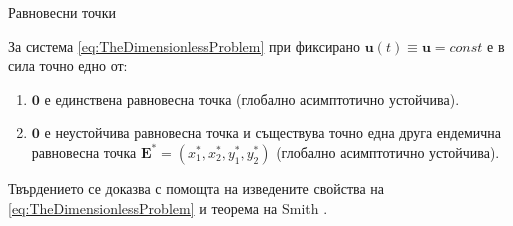\begin{frame}[t]{Равновесни точки}
  \begin{proposition}
    За система \eqref{eq:TheDimensionlessProblem} при фиксирано $\boldsymbol{u}(t) \equiv \boldsymbol{u} = const$ е в сила точно едно от:
    \begin{enumerate}
      \item $\pmb{0}$ е единствена равновесна точка (глобално асимптотично устойчива).
      \item $\pmb{0}$ е неустойчива равновесна точка и съществува точно една друга ендемична равновесна точка $\boldsymbol{E}^* = (x_1^*, x_2^*, y_1^*, y_2^*)$ (глобално асимптотично устойчива).
    \end{enumerate}
  \end{proposition}
  Твърдението се доказва с помощта на изведените свойства на \eqref{eq:TheDimensionlessProblem} и теорема на Smith \cite{Smith1986}.
\end{frame}
